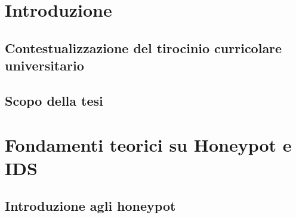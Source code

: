 \documentclass[12pt,a4paper,oneside,onecolumn,openright]{book}
\begin{document}
	\tableofcontents
	
	\chapter{Introduzione}
	\section{Contestualizzazione del tirocinio curricolare universitario}
	\section{Scopo della tesi}
	
	
	\chapter{Fondamenti teorici su Honeypot e IDS}
	\section{Introduzione agli honeypot}
\end{document}
